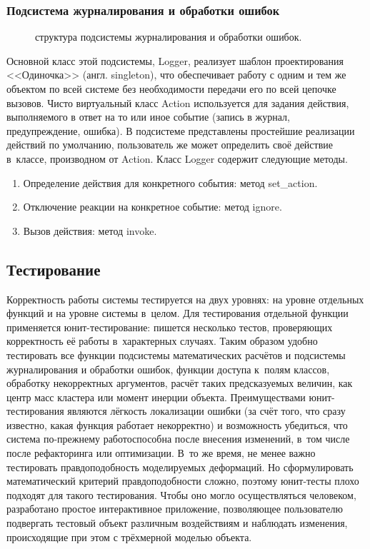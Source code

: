 \documentclass[a4paper, 14pt, titlepage]{extarticle}
\newcommand{\eng}[1]{{\English #1}}
\newcommand{\includefigure}[2]{
    \begin{figure}[!htb]
      \center{\texttt{[image: \#1]}}
      \caption{#2} \label{fig:#1}
    \end{figure}
  }
\begin{document}
      \subsubsection{Подсистема журналирования и обработки ошибок}
        \includefigure{logging}{структура подсистемы журналирования и обработки ошибок.}

        Основной класс этой подсистемы, Logger, реализует шаблон проектирования <<Одиночка>> (англ.
        \eng{singleton}), что обеспечивает работу с одним и тем же объектом по всей системе без
        необходимости передачи его по всей цепочке вызовов. Чисто виртуальный класс Action
        используется для задания действия, выполняемого в ответ на то или иное событие (запись в
        журнал, предупреждение, ошибка). В подсистеме представлены простейшие реализации действий по
        умолчанию, пользователь же может определить своё действие в~классе, производном от Action. Класс
        Logger содержит следующие методы.
        \begin{enumerate}
          \item Определение действия для конкретного события: метод set\_action.
          \item Отключение реакции на конкретное событие: метод ignore.
          \item Вызов действия: метод invoke.
        \end{enumerate}

    \subsection{Тестирование}

      Корректность работы системы тестируется на двух уровнях: на уровне отдельных функций и на
      уровне системы в~целом. Для тестирования отдельной функции применяется юнит-тестирование:
      пишется несколько тестов, проверяющих корректность её работы в~характерных случаях. Таким
      образом удобно тестировать все функции подсистемы математических расчётов и подсистемы
      журналирования и обработки ошибок, функции доступа к~полям классов, обработку некорректных
      аргументов, расчёт таких предсказуемых величин, как центр масс кластера или
      момент инерции объекта. Преимуществами юнит-тестирования являются лёгкость локализации ошибки
      (за счёт того, что сразу известно, какая функция работает некорректно) и возможность
      убедиться, что система по-прежнему работоспособна после внесения изменений, в~том числе
      после рефакторинга или оптимизации. В~то же время, не менее важно тестировать правдоподобность
      моделируемых деформаций. Но сформулировать математический критерий правдоподобности сложно,
      поэтому юнит-тесты плохо подходят для такого тестирования. Чтобы оно могло осуществляться
      человеком, разработано простое интерактивное приложение, позволяющее пользователю подвергать
      тестовый объект различным воздействиям и наблюдать изменения, происходящие при этом с
      трёхмерной моделью объекта.
\end{document}
